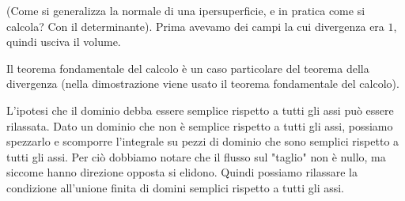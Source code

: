 \documentclass[a4paper]{article}
\begin{document}
(Come si generalizza la normale di una ipersuperficie, e in pratica come si calcola? Con il determinante).
Prima avevamo dei campi la cui divergenza era \(1\), quindi usciva il volume.

Il teorema fondamentale del calcolo è un caso particolare del teorema della divergenza
(nella dimostrazione viene usato il teorema fondamentale del calcolo).

L'ipotesi che il dominio debba essere semplice rispetto a tutti gli assi può essere rilassata.
Dato un dominio che non è semplice rispetto a tutti gli assi, possiamo spezzarlo
e scomporre l'integrale su pezzi di dominio che sono semplici rispetto a tutti gli assi.
Per ciò dobbiamo notare che il flusso sul "taglio" non è nullo, ma siccome hanno
direzione opposta si elidono. Quindi possiamo rilassare la condizione all'unione finita di domini
semplici rispetto a tutti gli assi.
\end{document}
